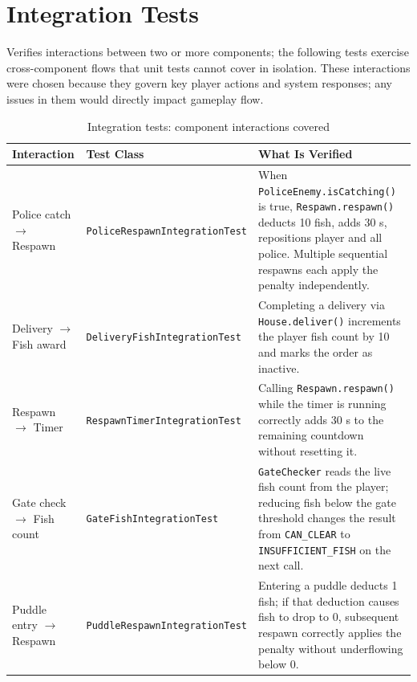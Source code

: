 \documentclass[12pt]{article}
\begin{document}
\bigskip
\bigskip
\bigskip



\section{Integration Tests}

Verifies interactions between two or more components; the following tests exercise cross-component flows that unit tests cannot cover in isolation. These interactions were chosen because they govern key player actions and system responses; any issues in them would directly impact gameplay flow.

\renewcommand{\arraystretch}{1.3}
\begin{table}[H]
\centering
\begin{tabular}{p{} p{} p{}}
\toprule
\textbf{Interaction} & \textbf{Test Class} & \textbf{What Is Verified} \\
\midrule
Police catch $\to$ Respawn &
  \texttt{PoliceRespawnIntegrat\-ionTest} &
  When \texttt{PoliceEnemy.isCatching()} is true, \texttt{Respawn.respawn()} deducts 10 fish, adds 30 s, repositions player and all police. Multiple sequential respawns each apply the penalty independently. \\

\addlinespace
Delivery $\to$ Fish award &
  \texttt{DeliveryFishIntegrati\-onTest} &
  Completing a delivery via \texttt{House.deliver()} increments the player fish count by 10 and marks the order as inactive. \\

\addlinespace
Respawn $\to$ Timer &
  \texttt{RespawnTimerIntegrati\-onTest} &
  Calling \texttt{Respawn.respawn()} while the timer is running correctly adds 30 s to the remaining countdown without resetting it. \\

\addlinespace
Gate check $\to$ Fish count &
  \texttt{GateFishIntegrationT\-est} &
  \texttt{GateChecker} reads the live fish count from the player; reducing fish below the gate threshold changes the result from \texttt{CAN\_CLEAR} to \texttt{INSUFFICIENT\_FISH} on the next call. \\

\addlinespace
Puddle entry $\to$ Respawn &
  \texttt{PuddleRespawnIntegrat\-ionTest} &
  Entering a puddle deducts 1 fish; if that deduction causes fish to drop to 0, subsequent respawn correctly applies the penalty without underflowing below 0. \\

\bottomrule
\end{tabular}
\caption{Integration tests: component interactions covered}
\end{table}
\end{document}
